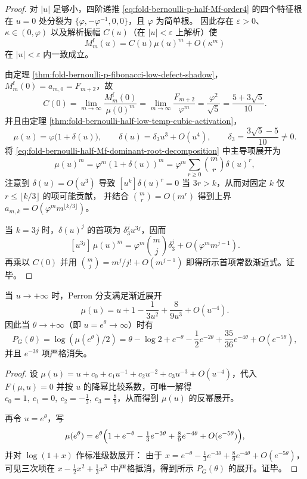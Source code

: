 \begin{proof}
对 \(|u|\) 足够小，四阶递推 \eqref{eq:fold-bernoulli-p-half-Mf-order4} 的四个特征根在 \(u=0\) 处分裂为 \(\{\varphi,-\varphi^{-1},0,0\}\)，且 \(\varphi\) 为简单根。
因此存在 \(\varepsilon>0\)、\(\kappa\in(0,\varphi)\) 以及解析振幅 \(C(u)\)（在 \(|u|<\varepsilon\) 上解析）使
\begin{equation}\label{eq:fold-bernoulli-half-Mf-dominant-root-decomposition}
M_m^{\mathrm f}(u)=C(u)\mu(u)^m+O(\kappa^m)
\end{equation}
在 \(|u|<\varepsilon\) 内一致成立。
\par
由定理 \ref{thm:fold-bernoulli-p-fibonacci-low-defect-shadow}，\(M_m^{\mathrm f}(0)=a_{m,0}=F_{m+2}\)，故
\[
C(0)=\lim_{m\to\infty}\frac{M_m^{\mathrm f}(0)}{\mu(0)^m}
=\lim_{m\to\infty}\frac{F_{m+2}}{\varphi^m}
=\frac{\varphi^2}{\sqrt5}
=\frac{5+3\sqrt5}{10}.
\]
并且由定理 \ref{thm:fold-bernoulli-half-low-temp-cubic-activation}，
\[
\mu(u)=\varphi\bigl(1+\delta(u)\bigr),
\qquad
\delta(u)=\delta_3u^3+O(u^4),
\qquad
\delta_3=\frac{3\sqrt5-5}{10}\neq 0.
\]
将 \eqref{eq:fold-bernoulli-half-Mf-dominant-root-decomposition} 中主导项展开为
\[
\mu(u)^m=\varphi^m(1+\delta(u))^m=\varphi^m\sum_{r\ge 0}\binom{m}{r}\delta(u)^r,
\]
注意到 \(\delta(u)=O(u^3)\) 导致 \([u^k]\delta(u)^r=0\) 当 \(3r>k\)，从而对固定 \(k\) 仅 \(r\le \lfloor k/3\rfloor\) 的项可能贡献，
并结合 \(\binom{m}{r}=O(m^r)\) 得到上界 \(a_{m,k}=O(\varphi^m m^{\lfloor k/3\rfloor})\)。
\par
当 \(k=3j\) 时，\(\delta(u)^j\) 的首项为 \(\delta_3^ju^{3j}\)，因而
\[
[u^{3j}]\,\mu(u)^m=\varphi^m\binom{m}{j}\delta_3^j+O(\varphi^m m^{j-1}).
\]
再乘以 \(C(0)\) 并用 \(\binom{m}{j}=m^j/j!+O(m^{j-1})\) 即得所示首项常数渐近式。证毕。
\end{proof}

\begin{theorem}\label{thm:fold-bernoulli-half-high-temp-inverse-power}
当 \(u\to+\infty\) 时，Perron 分支满足渐近展开
\[
\mu(u)=u+1-\frac{1}{3u^{2}}+\frac{8}{9u^{3}}+O(u^{-4}).
\]
因此当 \(\theta\to+\infty\)（即 \(u=e^\theta\to\infty\)）时有
\[
P_G(\theta)=\log(\mu(e^\theta)/2)
=\theta-\log2+e^{-\theta}-\frac12e^{-2\theta}+\frac{35}{36}e^{-4\theta}+O(e^{-5\theta}),
\]
并且 \(e^{-3\theta}\) 项严格消失。
\end{theorem}

\begin{proof}
设
\(
\mu(u)=u+c_0+c_1u^{-1}+c_2u^{-2}+c_3u^{-3}+O(u^{-4})
\)，代入 \(F(\mu,u)=0\) 并按 \(u\) 的降幂比较系数，可唯一解得
\(
c_0=1,\ c_1=0,\ c_2=-\tfrac13,\ c_3=\tfrac89
\)，从而得到 \(\mu(u)\) 的反幂展开。
\par
再令 \(u=e^\theta\)，写
\[
\mu(e^\theta)=e^\theta\Bigl(1+e^{-\theta}-\tfrac13e^{-3\theta}+\tfrac89e^{-4\theta}+O(e^{-5\theta})\Bigr),
\]
并对 \(\log(1+x)\) 作标准级数展开：
由于 \(x=e^{-\theta}-\tfrac13e^{-3\theta}+\tfrac89e^{-4\theta}+O(e^{-5\theta})\)，可见三次项在
\(
x-\tfrac12x^2+\tfrac13x^3
\)
中严格抵消，得到所示 \(P_G(\theta)\) 的展开。证毕。
\end{proof}

\endinput

